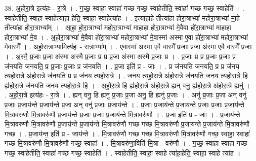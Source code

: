 \documentclass[17pt]{extarticle}
\begin{document}
38. अ॒हो॒रा॒त्रे इत्य॑हः - रा॒त्रे । . ग॒च्छ॒ स्वाहा॒ स्वाहा॑ गच्छ गच्छ॒ स्वाहेतीति॒ स्वाहा॑ गच्छ गच्छ॒ स्वाहेति॑ । . स्वाहेतीति॒ स्वाहा॒ स्वाहेत्या॑हा॒ हेति॒ स्वाहा॒ स्वाहेत्या॑ह । . इत्या॑हा॒हे तीत्या॑हा होरा॒त्राभ्या॑ महोरा॒त्राभ्या॑ मा॒हे तीत्या॑हा होरा॒त्राभ्या᳚म् । . आ॒हा॒ हो॒रा॒त्राभ्या॑ महोरा॒त्राभ्या॑ माहाहा होरा॒त्राभ्या॑ मे॒वैवा हो॑रा॒त्राभ्या॑ माहाहा होरा॒त्राभ्या॑ मे॒व । . अ॒हो॒रा॒त्राभ्या॑ मे॒वैवा हो॑रा॒त्राभ्या॑ महोरा॒त्राभ्या॑ मे॒वास्मा॑ अस्मा ए॒वा हो॑रा॒त्राभ्या॑ महोरा॒त्राभ्या॑ मे॒वास्मै᳚ । . अ॒हो॒रा॒त्राभ्या॒मित्य॑हः - रा॒त्राभ्या᳚म् । . ए॒वास्मा॑ अस्मा ए॒वै वास्मै᳚ प्र॒जाः प्र॒जा अ॑स्मा ए॒वै वास्मै᳚ प्र॒जाः । . अ॒स्मै॒ प्र॒जाः प्र॒जा अ॑स्मा अस्मै प्र॒जाः प्र प्र प्र॒जा अ॑स्मा अस्मै प्र॒जाः प्र । . प्र॒जाः प्र प्र प्र॒जाः प्र॒जाः प्र ज॑नयति जनयति॒ प्र प्र॒जाः प्र॒जाः प्र ज॑नयति । . प्र॒जा इति॑ प्र - जाः । . प्र ज॑नयति जनयति॒ प्र प्र ज॑नय त्यहोरा॒त्रे अ॑होरा॒त्रे ज॑नयति॒ प्र प्र ज॑नय त्यहोरा॒त्रे । . ज॒न॒य॒ त्य॒हो॒रा॒त्रे अ॑होरा॒त्रे ज॑नयति जनय त्यहोरा॒त्रे हि ह्य॑होरा॒त्रे ज॑नयति जनय त्यहोरा॒त्रे हि । . अ॒हो॒रा॒त्रे हि ह्य॑होरा॒त्रे अ॑होरा॒त्रे ह्यन् वनु॒ ह्य॑होरा॒त्रे अ॑होरा॒त्रे ह्यनु॑ । . अ॒हो॒रा॒त्रे इत्य॑हः - रा॒त्रे । . ह्यन् वनु॒ हि ह्यनु॑ प्र॒जाः प्र॒जा अनु॒ हि ह्यनु॑ प्र॒जाः । . अनु॑ प्र॒जाः प्र॒जा अन् वनु॑ प्र॒जाः प्र॒जाय॑न्ते प्र॒जाय॑न्ते प्र॒जा अन् वनु॑ प्र॒जाः प्र॒जाय॑न्ते । . प्र॒जाः प्र॒जाय॑न्ते प्र॒जाय॑न्ते प्र॒जाः प्र॒जाः प्र॒जाय॑न्ते मि॒त्रावरु॑णौ मि॒त्रावरु॑णौ प्र॒जाय॑न्ते प्र॒जाः प्र॒जाः प्र॒जाय॑न्ते मि॒त्रावरु॑णौ । . प्र॒जा इति॑ प्र - जाः । . प्र॒जाय॑न्ते मि॒त्रावरु॑णौ मि॒त्रावरु॑णौ प्र॒जाय॑न्ते प्र॒जाय॑न्ते मि॒त्रावरु॑णौ गच्छ गच्छ मि॒त्रावरु॑णौ प्र॒जाय॑न्ते प्र॒जाय॑न्ते मि॒त्रावरु॑णौ गच्छ । . प्र॒जाय॑न्त॒ इति॑ प्र - जाय॑न्ते । . मि॒त्रावरु॑णौ गच्छ गच्छ मि॒त्रावरु॑णौ मि॒त्रावरु॑णौ गच्छ॒ स्वाहा॒ स्वाहा॑ गच्छ मि॒त्रावरु॑णौ मि॒त्रावरु॑णौ गच्छ॒ स्वाहा᳚ । . मि॒त्रावरु॑णा॒विति॑ मि॒त्रा - वरु॑णौ । . ग॒च्छ॒ स्वाहा॒ स्वाहा॑ गच्छ गच्छ॒ स्वाहेतीति॒ स्वाहा॑ गच्छ गच्छ॒ स्वाहेति॑ । . स्वाहेतीति॒ स्वाहा॒ स्वाहे त्या॑हा॒हेति॒ स्वाहा॒ स्वाहे त्या॑ह । \newline
\pagebreak
{}
\end{document}
